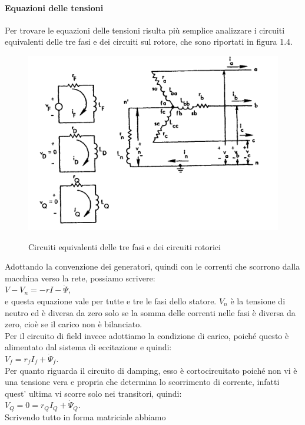 \documentclass[Lau,noexaminfo]{sapthesis}
\begin{document}
	\paragraph{Equazioni delle tensioni}
	Per trovare le equazioni delle tensioni risulta più semplice analizzare i circuiti equivalenti delle tre fasi e dei circuiti sul rotore, che sono riportati in figura 1.4.
	\begin{figure}
		\centering
		\includegraphics[height=0.3\textheight]{trifase}\\
		\caption{Circuiti equivalenti delle tre fasi e dei circuiti rotorici}
	\end{figure}
	Adottando la convenzione dei generatori, quindi con le correnti che scorrono dalla macchina verso la rete, possiamo scrivere:\\
	$V-V_n=-rI-\dot{\Psi}$, \\e questa equazione vale per tutte e tre le fasi dello statore. $V_n$ è la tensione di neutro ed è diversa da zero solo se la somma delle correnti nelle fasi è diversa da zero, cioè se il carico non è bilanciato.\\
	Per il circuito di field invece adottiamo la condizione di carico, poiché questo è alimentato dal sistema di eccitazione e quindi:\\
	$V_f=r_fI_f+\dot{\Psi}_f$.\\
	Per quanto riguarda il circuito di damping, esso è cortocircuitato poiché non vi è una tensione vera e propria che determina lo scorrimento di corrente, infatti quest' ultima vi scorre solo nei transitori, quindi:\\
	$V_Q=0=r_QI_Q + \dot{\Psi}_Q$.\\Scrivendo tutto in forma matriciale abbiamo\\\\
\end{document}
